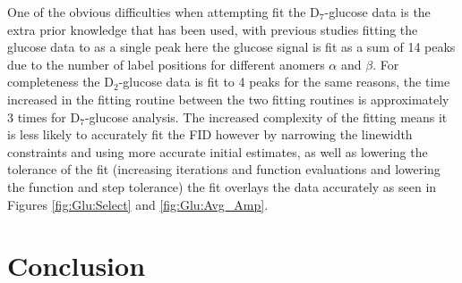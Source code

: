 \documentclass[class=article, crop=false]{standalone}
\begin{document}

One of the obvious difficulties when attempting fit the D$_7$-glucose data is the extra prior knowledge that has been used, with previous studies fitting the glucose data to as a single peak here the glucose signal is fit as a sum of 14 peaks due to the number of label positions for different anomers $\alpha$ and $\beta$. For completeness the D$_2$-glucose data is fit to 4 peaks for the same reasons, the time increased in the fitting routine between the two fitting routines is approximately 3 times for D$_7$-glucose analysis. The increased complexity of the fitting means it is less likely to accurately fit the FID however by narrowing the linewidth constraints and using more accurate initial estimates, as well as lowering the tolerance of the fit (increasing iterations and function evaluations and lowering the function and step tolerance) the fit overlays the data accurately as seen in Figures \ref{fig:Glu:Select} and \ref{fig:Glu:Avg_Amp}. 


\section{Conclusion}

\printbibliography %
\end{document}
